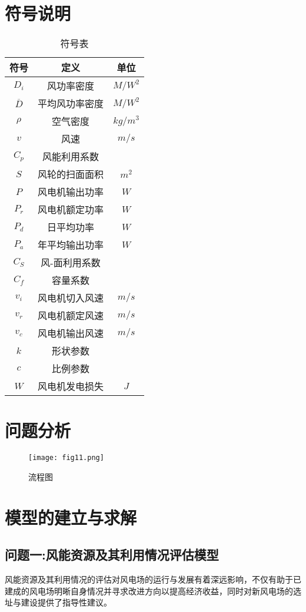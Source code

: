 \documentclass[withoutpreface,bwprint]{cumcmthesis} %
\begin{document}
	\section{符号说明}
	\begin{table}[!htbp]
		\caption{符号表}
		\centering
		\begin{tabular}{ccc}
		\toprule[1.5pt]
		符号 & 定义 & 单位\\
		\midrule[1pt]
		$D_i$ & 风功率密度 & $M/W^2$ \\
		$\overline{D}$ & 平均风功率密度 & $M/W^2$ \\
		$\rho$ & 空气密度 & $kg/m^3$\\
		$v$ & 风速 & $m/s$\\
		$C_p$ & 风能利用系数 & \\
		$S$ & 风轮的扫面面积 & $m^2$\\
		$P$ & 风电机输出功率 & $W$\\
		$P_r$ & 风电机额定功率 & $W$\\
		$P_d$ & 日平均功率 & $W$\\
		$P_a$ & 年平均输出功率 & $W$\\
		$C_S$ & 风-面利用系数 & \\
		$C_f$ & 容量系数 & \\
		$v_i$ & 风电机切入风速 & $m/s$\\
		$v_r$ & 风电机额定风速 & $m/s$\\
		$v_c$ & 风电机输出风速 & $m/s$\\
		$k$ & 形状参数 & \\
		$c$ & 比例参数 & \\
		$W$ & 风电机发电损失 & $J$\\
		\bottomrule[1.5pt]
		\end{tabular}
	\end{table}


	\section{问题分析}
	\begin{figure}[!htbp]
		\centering
		\texttt{[image: fig11.png]}
		\caption{流程图}
		\label{fig:flow}
	\end{figure}\par
	\section{模型的建立与求解}
		\subsection{问题一:风能资源及其利用情况评估模型}
		风能资源及其利用情况的评估对风电场的运行与发展有着深远影响，不仅有助于已建成的风电场明晰自身情况并寻求改进方向以提高经济收益，同时对新风电场的选址与建设提供了指导性建议。
\end{document}
